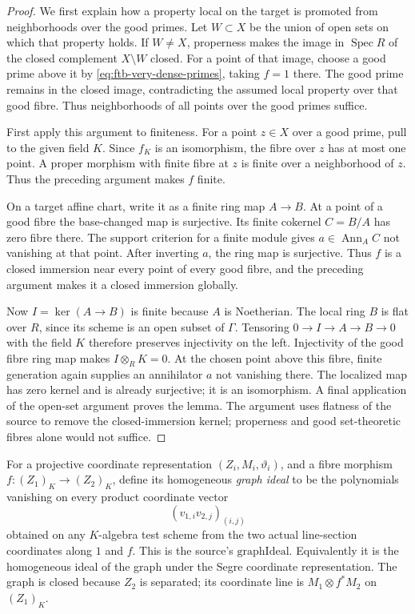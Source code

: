 \begin{proof}
We first explain how a property local on the target is
promoted from neighborhoods over the good primes.
Let \(W\subset X\) be the union of open sets on which
that property holds.
If \(W\ne X\), properness makes the image in
\(\operatorname{Spec}R\) of the closed complement \(X\setminus W\)
closed.
For a point of that image, choose a good prime above it
by \eqref{eq:ftb-very-dense-primes}, taking \(f=1\)
there.  The good prime remains in the closed image,
contradicting the assumed local property over that good
fibre.
Thus neighborhoods of all points over the good primes
suffice.

First apply this argument to finiteness.
For a point \(z\in X\) over a good prime, pull to the
given field \(K\).
Since \(f_K\) is an isomorphism, the fibre over \(z\)
has at most one point.
A proper morphism with finite fibre at \(z\) is finite
over a neighborhood of \(z\).
Thus the preceding argument makes \(f\) finite.

On a target affine chart, write it as a finite ring map
\(A\to B\).
At a point of a good fibre the base-changed map is
surjective.
Its finite cokernel \(C=B/A\) has zero fibre there.
The support criterion for a finite module gives
\(a\in\operatorname{Ann}_A C\) not vanishing at that
point.  After inverting \(a\), the ring map is surjective.
Thus \(f\) is a closed immersion near every point of
every good fibre, and the preceding argument makes it
a closed immersion globally.

Now \(I=\ker(A\to B)\) is finite because \(A\) is
Noetherian.
The local ring \(B\) is flat over \(R\), since its
scheme is an open subset of \(\Gamma\).
Tensoring \(0\to I\to A\to B\to0\) with the field \(K\)
therefore preserves injectivity on the left.
Injectivity of the good fibre ring map makes
\(I\otimes_RK=0\).
At the chosen point above this fibre, finite generation
again supplies an annihilator \(a\) not vanishing there.
The localized map has zero kernel and is already
surjective; it is an isomorphism.
A final application of the open-set argument proves
the lemma.
The argument uses flatness of the source to remove
the closed-immersion kernel; properness and good
set-theoretic fibres alone would not suffice.
\end{proof}

For a projective coordinate representation
\((Z_i,M_i,\vartheta_i)\), and a fibre morphism
\(f:(Z_1)_K\to(Z_2)_K\), define its homogeneous
\emph{graph ideal} to be the polynomials vanishing on
every product coordinate vector
\[
                  (v_{1,i}v_{2,j})_{(i,j)}
\]
obtained on any \(K\)-algebra test scheme from the two
actual line-section coordinates along \(1\) and \(f\).
This is the source's \(\mathrm{graphIdeal}\).
Equivalently it is the homogeneous ideal of the graph
under the Segre coordinate representation.
The graph is closed because \(Z_2\) is separated; its
coordinate line is \(M_1\otimes f^*M_2\) on \((Z_1)_K\).

